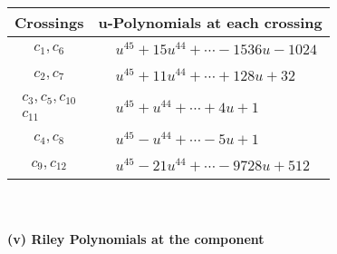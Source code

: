 \documentclass[1p]{elsarticle_modified}
\theoremstyle{definition}
\begin{document}
\begin{tabular}{m{50pt}|m{274pt}}
Crossings & \hspace{64pt}u-Polynomials at each crossing \\
\hline $$\begin{aligned}c_{1},c_{6}\end{aligned}$$&$\begin{aligned}
&u^{45}+15 u^{44}+\cdots-1536 u-1024
\end{aligned}$\\
\hline $$\begin{aligned}c_{2},c_{7}\end{aligned}$$&$\begin{aligned}
&u^{45}+11 u^{44}+\cdots+128 u+32
\end{aligned}$\\
\hline $$\begin{aligned}c_{3},c_{5},c_{10}\\c_{11}\end{aligned}$$&$\begin{aligned}
&u^{45}+u^{44}+\cdots+4 u+1
\end{aligned}$\\
\hline $$\begin{aligned}c_{4},c_{8}\end{aligned}$$&$\begin{aligned}
&u^{45}- u^{44}+\cdots-5 u+1
\end{aligned}$\\
\hline $$\begin{aligned}c_{9},c_{12}\end{aligned}$$&$\begin{aligned}
&u^{45}-21 u^{44}+\cdots-9728 u+512
\end{aligned}$\\
\hline
\end{tabular}\\~\\
\newpage\renewcommand{\arraystretch}{1}
\flushleft \textbf{(v) Riley Polynomials at the component}\newline \\
\end{document}
